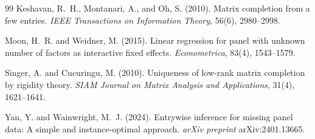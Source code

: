 \documentclass[11pt]{article}
\theoremstyle{definition}
\theoremstyle{plain}
\theoremstyle{remark}
\begin{document}
\begin{thebibliography}{99}
Keshavan, R.~H., Montanari, A., and Oh, S. (2010). Matrix completion from a
few entries. \emph{IEEE Transactions on Information Theory}, 56(6), 2980--2998.

Moon, H.~R. and Weidner, M. (2015). Linear regression for panel with unknown
number of factors as interactive fixed effects. \emph{Econometrica}, 83(4),
1543--1579.

Singer, A. and Cucuringu, M. (2010). Uniqueness of low-rank matrix completion
by rigidity theory. \emph{SIAM Journal on Matrix Analysis and Applications},
31(4), 1621--1641.

Yan, Y. and Wainwright, M.~J. (2024). Entrywise inference for missing panel
data: A simple and instance-optimal approach. \emph{arXiv preprint}
arXiv:2401.13665.
\end{thebibliography}
\end{document}
